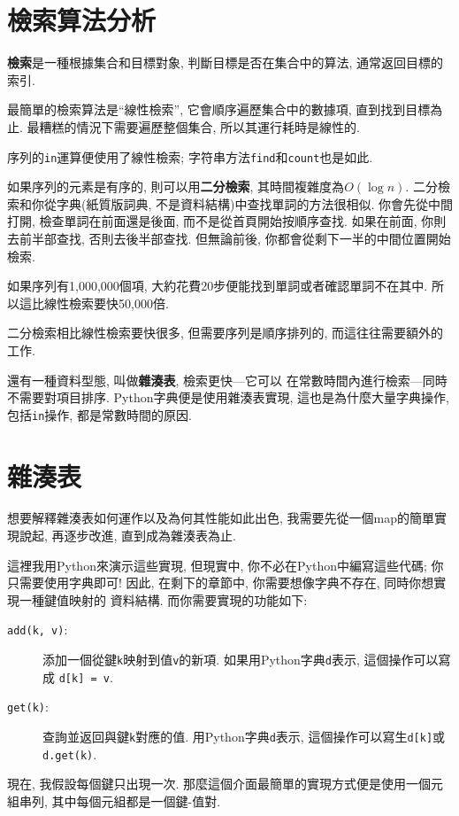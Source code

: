 \documentclass[10pt]{book}
\begin{document}
\section{檢索算法分析}

{\bf 檢索}是一種根據集合和目標對象, 判斷目標是否在集合中的算法, 
通常返回目標的索引. 

最簡單的檢索算法是``線性檢索'', 它會順序遍歷集合中的數據項, 直到找到目標為止. 
最糟糕的情況下需要遍歷整個集合, 所以其運行耗時是線性的.

序列的{\tt in}運算便使用了線性檢索;
字符串方法{\tt find}和{\tt count}也是如此.

如果序列的元素是有序的, 則可以用{\bf 二分檢索}, 其時間複雜度為$O(\log n)$. 
二分檢索和你從字典(紙質版詞典, 不是資料結構)中查找單詞的方法很相似. 
你會先從中間打開, 檢查單詞在前面還是後面, 而不是從首頁開始按順序查找. 
如果在前面, 你則去前半部查找, 否則去後半部查找. 
但無論前後, 你都會從剩下一半的中間位置開始檢索. 

如果序列有1,000,000個項, 大約花費20步便能找到單詞或者確認單詞不在其中. 
所以這比線性檢索要快50,000倍. 

二分檢索相比線性檢索要快很多, 但需要序列是順序排列的, 
而這往往需要額外的工作. 

還有一種資料型態, 叫做{\bf 雜湊表}, 檢索更快---它可以
在常數時間內進行檢索---同時不需要對項目排序. 
Python字典便是使用雜湊表實現, 這也是為什麼大量字典操作, 包括{\tt in}操作, 
都是常數時間的原因. 


\section{雜湊表}
\label{hashtable}

想要解釋雜湊表如何運作以及為何其性能如此出色, 
我需要先從一個map的簡單實現說起, 
再逐步改進, 直到成為雜湊表為止. 

這裡我用Python來演示這些實現, 但現實中, 你不必在Python中編寫這些代碼; 
你只需要使用字典即可!
因此, 在剩下的章節中, 你需要想像字典不存在, 同時你想實現一種鍵值映射的
資料結構. 而你需要實現的功能如下:

\begin{description}

\item[{\tt add(k, v)}:] 添加一個從鍵{\tt k}映射到值{\tt v}的新項.
如果用Python字典{\tt d}表示, 這個操作可以寫成 {\tt d[k] = v}.

\item[{\tt get(k)}:] 查詢並返回與鍵{\tt k}對應的值.
用Python字典{\tt d}表示, 這個操作可以寫生{\tt d[k]}或{\tt d.get(k)}.

\end{description}
現在, 我假設每個鍵只出現一次.
那麼這個介面最簡單的實現方式便是使用一個元組串列,
其中每個元組都是一個鍵-值對.
\end{document}
